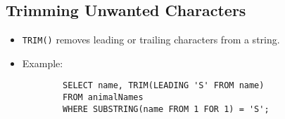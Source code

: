 \documentclass{article}
\begin{document}
\subsection{Trimming Unwanted Characters}
\begin{itemize}
    \item \texttt{TRIM()} removes leading or trailing characters from a string.
    \item Example:
    \begin{verbatim}
        SELECT name, TRIM(LEADING 'S' FROM name)
        FROM animalNames
        WHERE SUBSTRING(name FROM 1 FOR 1) = 'S';
    \end{verbatim}
\end{itemize}
\end{document}
